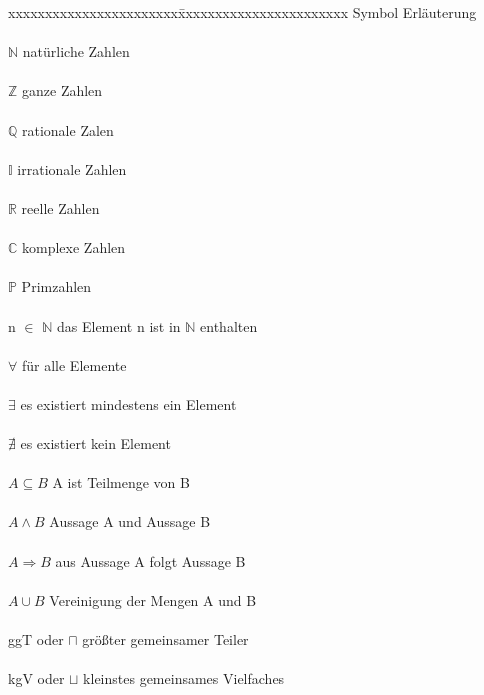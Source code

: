 \documentclass[12pt,a4paper]{article}
\theoremstyle{definition}
\begin{document}
\begin{tabbing}
xxxxxxxxxxxxxxxxxxxxxxx\=xxxxxxxxxxxxxxxxxxxxxxx\kill
\large Symbol             \> \large Erläuterung\\
\\$\mathbb{N}$            \> natürliche Zahlen\\
\\$\mathbb{Z}$            \> ganze Zahlen\\
\\$\mathbb{Q}$            \> rationale Zalen\\
\\$\mathbb{I}$            \> irrationale Zahlen\\
\\$\mathbb{R}$            \> reelle Zahlen\\
\\$\mathbb{C}$            \> komplexe Zahlen\\
\\$\mathbb{P}$            \> Primzahlen\\
\\n $\in$ $\mathbb{N}$    \> das Element n ist in $\mathbb{N}$ enthalten\\
\\$\forall$               \> für alle Elemente\\
\\$\exists$               \> es existiert mindestens ein Element\\
\\$\nexists$              \> es existiert kein Element\\
\\$A \subseteq B$         \> A ist Teilmenge von B\\
\\$A \land B $            \> Aussage A und Aussage B\\
\\$A \Rightarrow B $      \> aus Aussage A folgt Aussage B\\
\\$A \cup B$              \> Vereinigung der Mengen A und B\\
\\ggT  oder $\sqcap$      \> größter gemeinsamer Teiler\\
\\kgV  oder $\sqcup$      \> kleinstes gemeinsames Vielfaches
\end{tabbing}
\newpage
\end{document}
